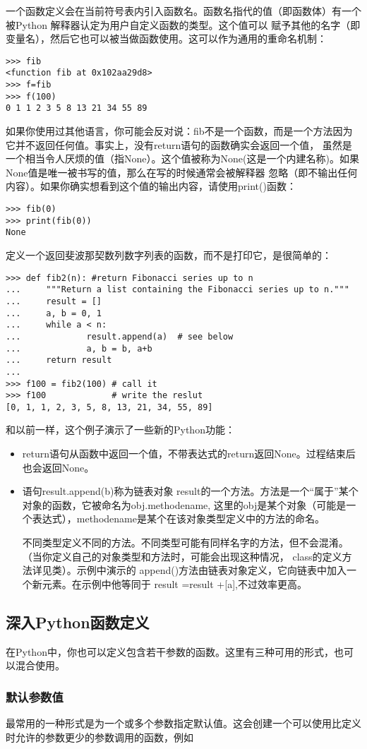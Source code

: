 \documentclass[UTF8]{ctexart}
\begin{document}
一个函数定义会在当前符号表内引入函数名。函数名指代的值（即函数体）有一个被Python 解释器认定为用户自定义函数的类型。这个值可以
赋予其他的名字（即变量名），然后它也可以被当做函数使用。这可以作为通用的重命名机制：
\begin{verbatim}
>>> fib
<function fib at 0x102aa29d8>
>>> f=fib
>>> f(100)
0 1 1 2 3 5 8 13 21 34 55 89
\end{verbatim}
如果你使用过其他语言，你可能会反对说：fib不是一个函数，而是一个方法因为它并不返回任何值。事实上，没有return语句的函数确实会返回一个值，
虽然是一个相当令人厌烦的值（指None）。这个值被称为None(这是一个内建名称)。如果None值是唯一被书写的值，那么在写的时候通常会被解释器
忽略（即不输出任何内容）。如果你确实想看到这个值的输出内容，请使用print()函数：
\begin{verbatim}
>>> fib(0)
>>> print(fib(0))
None
\end{verbatim}

定义一个返回斐波那契数列数字列表的函数，而不是打印它，是很简单的：
\begin{verbatim}
>>> def fib2(n): #return Fibonacci series up to n
...     """Return a list containing the Fibonacci series up to n."""
...     result = []
...     a, b = 0, 1
...     while a < n:
...             result.append(a)  # see below
...             a, b = b, a+b
...     return result
...
>>> f100 = fib2(100) # call it
>>> f100             # write the reslut
[0, 1, 1, 2, 3, 5, 8, 13, 21, 34, 55, 89]
\end{verbatim}

和以前一样，这个例子演示了一些新的Python功能：
\begin{itemize}
  \item return语句从函数中返回一个值，不带表达式的return返回None。过程结束后也会返回None。
  \item 语句result.append(b)称为链表对象 result的一个方法。方法是一个``属于''某个对象的函数，它被命名为obj.methodename,
  这里的obj是某个对象（可能是一个表达式），methodename是某个在该对象类型定义中的方法的命名。

  不同类型定义不同的方法。不同类型可能有同样名字的方法，但不会混淆。（当你定义自己的对象类型和方法时，可能会出现这种情况，
  class的定义方法详见类）。示例中演示的 append()方法由链表对象定义，它向链表中加入一个新元素。在示例中他等同于
  result =result +[a],不过效率更高。
\end{itemize}

\subsection{深入Python函数定义}
在Python中，你也可以定义包含若干参数的函数。这里有三种可用的形式，也可以混合使用。
\subsubsection{默认参数值}
最常用的一种形式是为一个或多个参数指定默认值。这会创建一个可以使用比定义时允许的参数更少的参数调用的函数，例如
\end{document}
